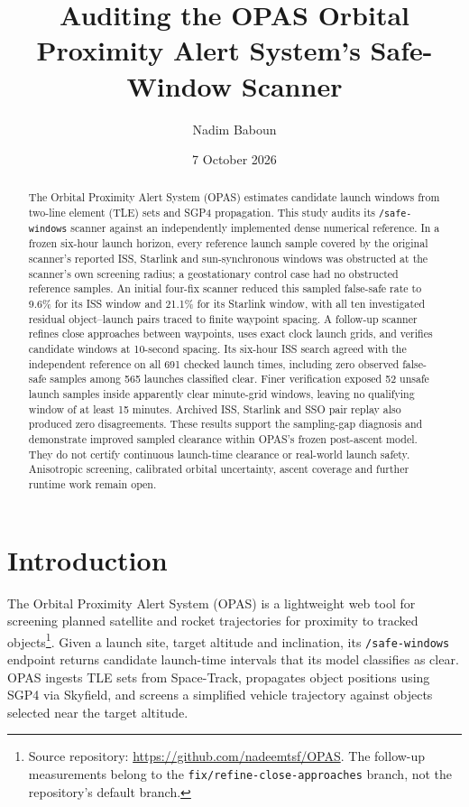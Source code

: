 \documentclass[11pt,a4paper]{article}
\title{Auditing the OPAS Orbital Proximity Alert System's Safe-Window Scanner}
\author[1]{Nadim Baboun}
\affil[1]{Al-Quds University}
\date{7 October 2026}
\begin{document}
\maketitle

\begin{abstract}
The Orbital Proximity Alert System (OPAS) estimates candidate launch windows
from two-line element (TLE) sets and SGP4 propagation. This study audits its
\texttt{/safe-windows} scanner against an independently implemented dense
numerical reference. In a frozen six-hour launch horizon, every reference
launch sample covered by the original scanner's reported ISS, Starlink and
sun-synchronous windows was obstructed at the scanner's own screening
radius; a geostationary control case had no obstructed reference samples.
An initial four-fix scanner reduced this sampled false-safe rate to 9.6\%
for its ISS window and 21.1\% for its Starlink window, with all ten
investigated residual object--launch pairs traced to finite waypoint
spacing. A follow-up scanner refines close approaches between waypoints,
uses exact clock launch grids, and verifies candidate windows at 10-second
spacing. Its six-hour ISS search agreed with the independent reference on
all 691 checked launch times, including zero observed false-safe samples
among 565 launches classified clear. Finer verification exposed 52 unsafe
launch samples inside apparently clear minute-grid windows, leaving no
qualifying window of at least 15 minutes. Archived ISS, Starlink and SSO
pair replay also produced zero disagreements. These results support the
sampling-gap diagnosis and demonstrate improved sampled clearance within
OPAS's frozen post-ascent model. They do not certify continuous launch-time
clearance or real-world launch safety. Anisotropic screening, calibrated
orbital uncertainty, ascent coverage and further runtime work remain open.
\end{abstract}

\section{Introduction}

The Orbital Proximity Alert System (OPAS) is a lightweight web tool for
screening planned satellite and rocket trajectories for proximity to
tracked objects\footnote{Source repository:
\url{https://github.com/nadeemtsf/OPAS}. The follow-up measurements belong to the
\texttt{fix/refine-close-approaches} branch, not the repository's default
branch.}. Given a launch site,
target altitude and inclination, its \texttt{/safe-windows} endpoint
returns candidate launch-time intervals that its model classifies as
clear. OPAS ingests TLE sets from Space-Track, propagates object positions
using SGP4 via Skyfield, and screens a simplified vehicle trajectory
against objects selected near the target altitude.
\end{document}
